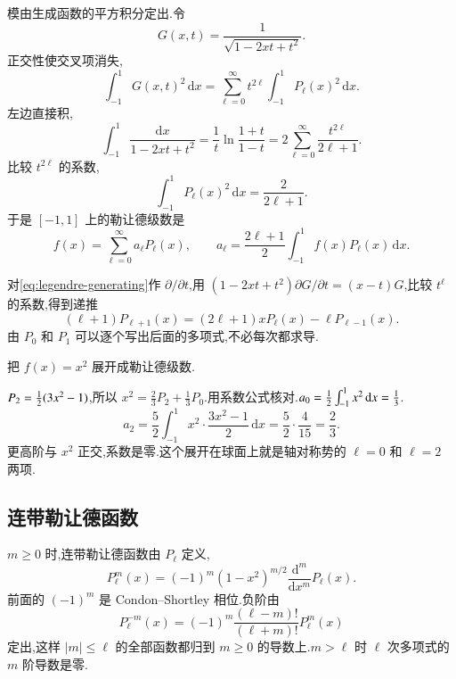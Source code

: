模由生成函数的平方积分定出.令
\begin{equation}
  G(x,t)=\frac{1}{\sqrt{1-2xt+t^2}}.
\end{equation}
正交性使交叉项消失,
\begin{equation}
  \int_{-1}^{1} G(x,t)^2\,\mathrm{d}x
  =\sum_{\ell=0}^{\infty} t^{2\ell}\int_{-1}^{1} P_{\ell}(x)^2\,\mathrm{d}x.
\end{equation}
左边直接积,
\begin{equation}
  \int_{-1}^{1}\frac{\mathrm{d}x}{1-2xt+t^2}
  =\frac{1}{t}\ln\frac{1+t}{1-t}
  =2\sum_{\ell=0}^{\infty}\frac{t^{2\ell}}{2\ell+1}.
\end{equation}
比较 $t^{2\ell}$ 的系数,
\begin{equation}
  \int_{-1}^{1} P_{\ell}(x)^2\,\mathrm{d}x=\frac{2}{2\ell+1}.
  \label{eq:legendre-norm}
\end{equation}
于是 $[-1,1]$ 上的勒让德级数是
\begin{equation}
  f(x)=\sum_{\ell=0}^{\infty} a_{\ell} P_{\ell}(x),
  \qquad
  a_{\ell}=\frac{2\ell+1}{2}\int_{-1}^{1} f(x)P_{\ell}(x)\,\mathrm{d}x.
  \label{eq:legendre-series}
\end{equation}

对\eqref{eq:legendre-generating}作 $\partial/\partial t$,用 $(1-2xt+t^2)\partial G/\partial t=(x-t)G$,比较 $t^{\ell}$ 的系数,得到递推
\begin{equation}
  (\ell+1)P_{\ell+1}(x)=(2\ell+1)x P_{\ell}(x)-\ell P_{\ell-1}(x).
  \label{eq:legendre-recurrence}
\end{equation}
由 $P_0$ 和 $P_1$ 可以逐个写出后面的多项式,不必每次都求导.

\begin{example}
把 $f(x)=x^2$ 展开成勒让德级数.
\end{example}
\begin{solution}
$P_2={\frac{1}{2}}(3x^2-1)$,所以 $x^2=\tfrac{2}{3}P_2+\tfrac{1}{3}P_0$.用系数公式核对.$a_0={\frac{1}{2}}\int_{-1}^{1}x^2\,\mathrm{d}x=\tfrac{1}{3}$.
\begin{equation}
  a_2=\frac{5}{2}\int_{-1}^{1} x^2\cdot\frac{3x^2-1}{2}\,\mathrm{d}x
  =\frac{5}{2}\cdot\frac{4}{15}
  =\frac{2}{3}.
\end{equation}
更高阶与 $x^2$ 正交,系数是零.这个展开在球面上就是轴对称势的 $\ell=0$ 和 $\ell=2$ 两项.
\end{solution}

\subsection{连带勒让德函数}
$m\geq 0$ 时,连带勒让德函数由 $P_{\ell}$ 定义,
\begin{equation}
  P_{\ell}^{m}(x)
  =(-1)^{m}(1-x^2)^{m/2}\frac{\mathrm{d}^{m}}{\mathrm{d}x^{m}}P_{\ell}(x).
  \label{eq:assoc-def}
\end{equation}
前面的 $(-1)^{m}$ 是 Condon--Shortley 相位.负阶由
\begin{equation}
  P_{\ell}^{-m}(x)
  =(-1)^{m}\frac{(\ell-m)!}{(\ell+m)!}P_{\ell}^{m}(x)
\end{equation}
定出,这样 $|m|\leq\ell$ 的全部函数都归到 $m\geq 0$ 的导数上.$m>\ell$ 时 $\ell$ 次多项式的 $m$ 阶导数是零.

